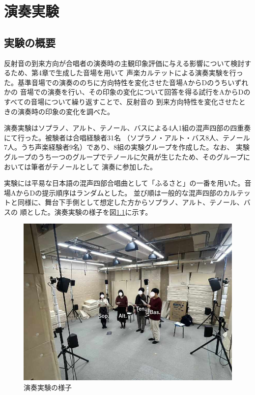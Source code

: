 \documentclass[11pt,a4j]{jreport}
\begin{document}
\chapter{演奏実験}


\section{実験の概要}
反射音の到来方向が合唱者の演奏時の主観印象評価に与える影響について検討するため、第4章で生成した音場を用いて
声楽カルテットによる演奏実験を行った。基準音場での演奏ののちに方向特性を変化させた音場AからDのうちいずれかの
音場での演奏を行い、その印象の変化について回答を得る試行をAからDのすべての音場について繰り返すことで、反射音の
到来方向特性を変化させたときの演奏時の印象の変化を調べた。

演奏実験はソプラノ、アルト、テノール、バスによる4人1組の混声四部の四重奏にて行った。被験者は合唱経験者31名
（ソプラノ・アルト・バス8人、テノール7人。うち声楽経験者9名）であり、8組の実験グループを作成した。なお、
実験グループのうち一つのグループでテノールに欠員が生じたため、そのグループにおいては筆者がテノールとして
演奏に参加した。

実験には平易な日本語の混声四部合唱曲として「ふるさと」の一番を用いた。音場AからDの提示順序はランダムとした。
並び順は一般的な混声四部のカルテットと同様に、舞台下手側として想定した方からソプラノ、アルト、テノール、バスの
順とした。演奏実験の様子を図\ref{fig:演奏実験の様子}に示す。

\vspace{1\baselineskip}

\begin{figure}[H]
  \centering
  \includegraphics[width=0.7\linewidth]{images/subjectiveExp/chorusExpLowQ.jpg}
  \caption{演奏実験の様子}
  \label{fig:演奏実験の様子}
\end{figure}
\end{document}
